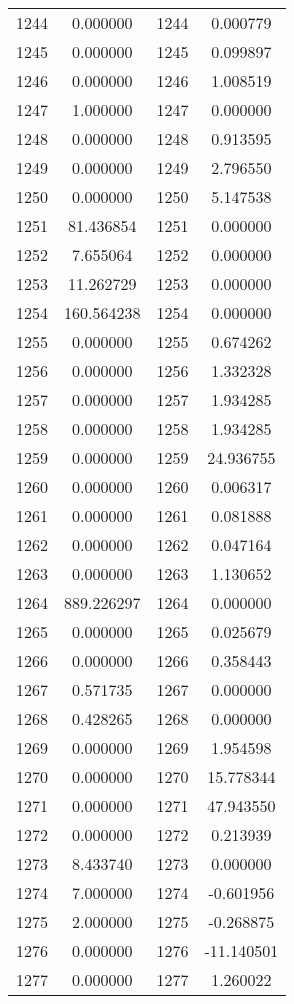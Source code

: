 \documentclass[12pt]{article}
\begin{document}
\begin{longtable}{@{}cccc@{}}
1244 & 0.000000 & 1244 & 0.000779 \\
1245 & 0.000000 & 1245 & 0.099897 \\
1246 & 0.000000 & 1246 & 1.008519 \\
1247 & 1.000000 & 1247 & 0.000000 \\
1248 & 0.000000 & 1248 & 0.913595 \\
1249 & 0.000000 & 1249 & 2.796550 \\
1250 & 0.000000 & 1250 & 5.147538 \\
1251 & 81.436854 & 1251 & 0.000000 \\
1252 & 7.655064 & 1252 & 0.000000 \\
1253 & 11.262729 & 1253 & 0.000000 \\
1254 & 160.564238 & 1254 & 0.000000 \\
1255 & 0.000000 & 1255 & 0.674262 \\
1256 & 0.000000 & 1256 & 1.332328 \\
1257 & 0.000000 & 1257 & 1.934285 \\
1258 & 0.000000 & 1258 & 1.934285 \\
1259 & 0.000000 & 1259 & 24.936755 \\
1260 & 0.000000 & 1260 & 0.006317 \\
1261 & 0.000000 & 1261 & 0.081888 \\
1262 & 0.000000 & 1262 & 0.047164 \\
1263 & 0.000000 & 1263 & 1.130652 \\
1264 & 889.226297 & 1264 & 0.000000 \\
1265 & 0.000000 & 1265 & 0.025679 \\
1266 & 0.000000 & 1266 & 0.358443 \\
1267 & 0.571735 & 1267 & 0.000000 \\
1268 & 0.428265 & 1268 & 0.000000 \\
1269 & 0.000000 & 1269 & 1.954598 \\
1270 & 0.000000 & 1270 & 15.778344 \\
1271 & 0.000000 & 1271 & 47.943550 \\
1272 & 0.000000 & 1272 & 0.213939 \\
1273 & 8.433740 & 1273 & 0.000000 \\
1274 & 7.000000 & 1274 & -0.601956 \\
1275 & 2.000000 & 1275 & -0.268875 \\
1276 & 0.000000 & 1276 & -11.140501 \\
1277 & 0.000000 & 1277 & 1.260022 \\

\end{longtable}
\end{document}
